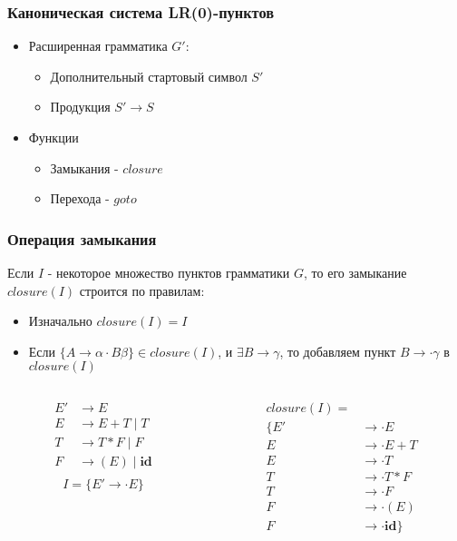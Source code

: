 \documentclass[16pt,pdf,unicode]{beamer}
\begin{document}
\begin{frame}
\frametitle{Каноническая система LR(0)-пунктов}
\begin{itemize}
  \item Расширенная грамматика $G'$:
    \begin{itemize}
      \item Дополнительный стартовый символ $S'$
      \item Продукция $S' \rightarrow S$
    \end{itemize}
  \item Функции
    \begin{itemize}
      \item Замыкания - $closure$
      \item Перехода - $goto$
    \end{itemize}
\end{itemize}
\end{frame}

\begin{frame}
\frametitle{Операция замыкания}
Если $I$ - некоторое множество пунктов грамматики $G$, то его замыкание $closure(I)$ строится по правилам:
\begin{itemize}
  \item Изначально $closure(I) = I$
  \item Если $\{A \rightarrow \alpha \cdot B \beta\} \in closure(I)$, и $\exists B\rightarrow \gamma$, то добавляем пункт $B \rightarrow \cdot \gamma$ в $closure(I)$
\end{itemize}
\pause
\begin{columns}
\begin{column}{0.5\textwidth}
\begin{align*}
  E' &\rightarrow E \\
  E &\rightarrow E + T \mid T \\
  T &\rightarrow T * F \mid F \\
  F &\rightarrow (E) \mid \textbf{id} \\
\end{align*}
$$ I = \{E' \rightarrow \cdot E \} $$
\end{column}
\begin{column}{0.5\textwidth}
\begin{align*}
closure(I) = \\
\{E' &\rightarrow \cdot E \\
  E &\rightarrow \cdot E + T \\
  E &\rightarrow \cdot T \\
  T &\rightarrow \cdot T * F \\
  T &\rightarrow \cdot F \\
  F &\rightarrow \cdot (E) \\
  F &\rightarrow \cdot \textbf{id}\}
\end{align*}
\end{column}
\end{columns}
\end{frame}
\end{document}
